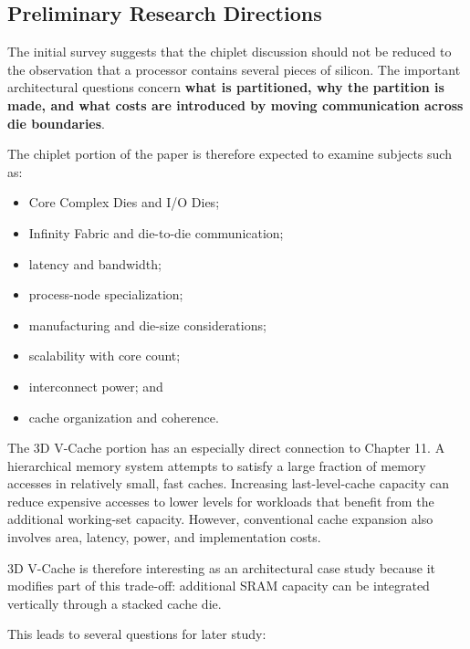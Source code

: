 \subsection{Preliminary Research Directions}
\label{sec:directions}

The initial survey suggests that the chiplet discussion should not be reduced to the observation that a processor contains several pieces of silicon. The important architectural questions concern \textbf{what is partitioned, why the partition is made, and what costs are introduced by moving communication across die boundaries}.

The chiplet portion of the paper is therefore expected to examine subjects such as:

\begin{itemize}
  \item Core Complex Dies and I/O Dies;
  \item Infinity Fabric and die-to-die communication;
  \item latency and bandwidth;
  \item process-node specialization;
  \item manufacturing and die-size considerations;
  \item scalability with core count;
  \item interconnect power; and
  \item cache organization and coherence.
\end{itemize}

The 3D V-Cache portion has an especially direct connection to Chapter 11. A hierarchical memory system attempts to satisfy a large fraction of memory accesses in relatively small, fast caches. Increasing last-level-cache capacity can reduce expensive accesses to lower levels for workloads that benefit from the additional working-set capacity. However, conventional cache expansion also involves area, latency, power, and implementation costs.

3D V-Cache is therefore interesting as an architectural case study because it modifies part of this trade-off: additional SRAM capacity can be integrated vertically through a stacked cache die.

This leads to several questions for later study:

